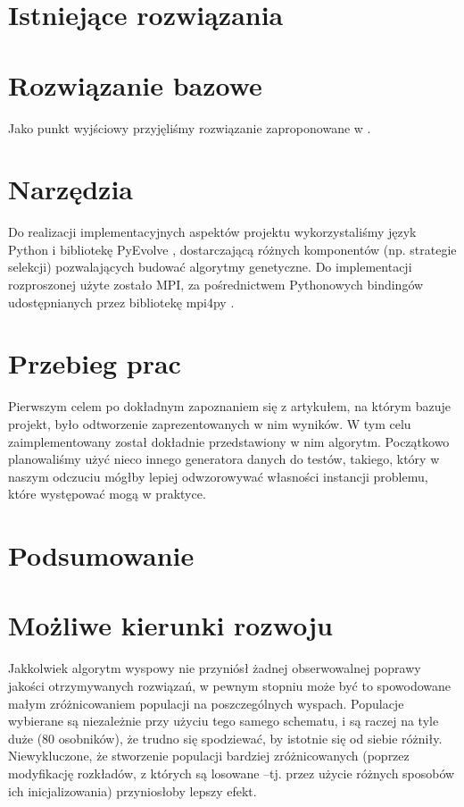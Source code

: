 \documentclass[11pt,pdftex,a4paper]{scrartcl}
\begin{document}
\section{Istniejące rozwiązania}

\section{Rozwiązanie bazowe}
Jako punkt wyjściowy przyjęliśmy rozwiązanie zaproponowane w \cite{Ahmad}.

\section{Narzędzia}
Do realizacji implementacyjnych aspektów projektu wykorzystaliśmy język Python i bibliotekę
PyEvolve \cite{pyevolve}, dostarczającą różnych komponentów (np. strategie selekcji) pozwalających
budować algorytmy genetyczne. Do implementacji rozproszonej użyte zostało MPI, za pośrednictwem
Pythonowych bindingów udostępnianych przez bibliotekę mpi4py \cite{mpi4py}.

\section{Przebieg prac}
Pierwszym celem po dokładnym zapoznaniem się z artykułem, na którym bazuje projekt, było odtworzenie
zaprezentowanych w nim wyników. W tym celu zaimplementowany został dokładnie przedstawiony w nim
algorytm. Początkowo planowaliśmy użyć nieco innego generatora danych do testów, takiego, który w
naszym odczuciu mógłby lepiej odwzorowywać własności instancji problemu, które występować mogą w 
praktyce. 


\section{Podsumowanie}

\section{Możliwe kierunki rozwoju}

Jakkolwiek algorytm wyspowy nie przyniósł żadnej obserwowalnej poprawy jakości otrzymywanych rozwiązań,
w pewnym stopniu może być to spowodowane małym zróżnicowaniem populacji na poszczególnych wyspach.
Populacje wybierane są niezależnie przy użyciu tego samego schematu, i są raczej na tyle duże (80
osobników), że trudno się spodziewać, by istotnie się od siebie różniły. Niewykluczone, że stworzenie
populacji bardziej zróżnicowanych (poprzez modyfikację rozkładów, z których są losowane --tj. przez
użycie różnych sposobów ich inicjalizowania) przyniosłoby lepszy efekt.
\end{document}
